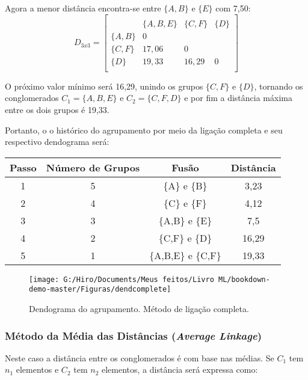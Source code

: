\documentclass[
]{book}
\begin{document}
Agora a menor distância encontra-se entre \(\{A,B\}\) e \(\{E\}\) com 7,50:
\[D_{3x3}=\begin{bmatrix}\\
 &\{A,B,E\}& \{C,F\}&\{D\} \\
 \{A,B\}&0&\\
 \{C,F\} & 17,06&0&\\
 \{D\}& 19,33& 16,29&0\\
\end{bmatrix}\]

O próximo valor mínimo será 16,29, unindo os grupos \(\{C,F\}\) e \(\{D\}\), tornando os conglomerados \(C_1=\{A,B,E\}\) e \(C_2=\{C,F,D\}\) e por fim a distância máxima entre os dois grupos é 19,33.

Portanto, o o histórico do agrupamento por meio da ligação completa e seu respectivo dendograma será:

\begin{longtable}[]{@{}cccc@{}}
\toprule
\textbf{Passo} & \textbf{Número de Grupos} & \textbf{Fusão} & \textbf{Distância}\tabularnewline
\midrule
\endhead
1 & 5 & \{A\} e \{B\} & 3,23\tabularnewline
2 & 4 & \{C\} e \{F\} & 4,12\tabularnewline
3 & 3 & \{A,B\} e \{E\} & 7,5\tabularnewline
4 & 2 & \{C,F\} e \{D\} & 16,29\tabularnewline
5 & 1 & \{A,B,E\} e \{C,F\} & 19,33\tabularnewline
\bottomrule
\end{longtable}

\begin{figure}

{\centering \texttt{[image: G:/Hiro/Documents/Meus feitos/Livro ML/bookdown-demo-master/Figuras/dendcomplete]} 

}

\caption{Dendograma do agrupamento. Método de ligação completa.}\label{fig:dendcomplete}
\end{figure}



\hypertarget{muxe9todo-da-muxe9dia-das-distuxe2ncias-average-linkage}{%
\subsubsection{\texorpdfstring{Método da Média das Distâncias (\emph{Average Linkage})}{Método da Média das Distâncias (Average Linkage)}}\label{muxe9todo-da-muxe9dia-das-distuxe2ncias-average-linkage}}

Neste caso a distância entre os conglomerados é com base nas médias. Se \(C_1\) tem \(n_1\) elementos e \(C_2\) tem \(n_2\) elementos, a distância será expressa como:
\end{document}
